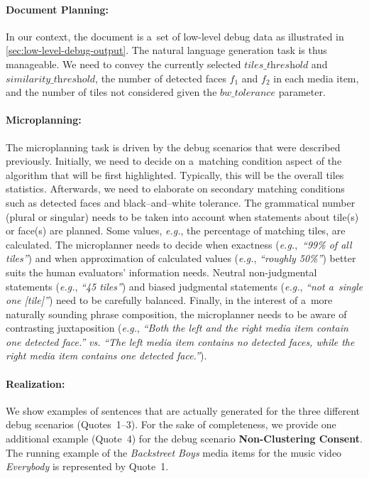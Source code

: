 \paragraph{Document Planning:}

In our context, the document is a~set of low-level debug data
as illustrated in \autoref{sec:low-level-debug-output}.
The natural language generation task is thus manageable.
We need to convey the currently selected $\textit{tiles\_threshold}$
and $\textit{similarity\_threshold}$, the number of detected faces
$f_1$ and $f_2$ in each media item, and the number of tiles
not considered given the $\textit{bw\_tolerance}$ parameter.

\paragraph{Microplanning:}

The microplanning task is driven by the debug scenarios
that were described previously.
Initially, we need to decide on a~matching condition aspect
of the algorithm that will be first highlighted.
Typically, this will be the overall tiles statistics.
Afterwards, we need to elaborate on secondary matching conditions
such as detected faces and black--and--white tolerance.
The grammatical number (plural or singular)
needs to be taken into account when statements about tile(s) or face(s)
are planned. Some values, \emph{e.g.},
the percentage of matching tiles, are calculated.
The microplanner needs to decide when exactness
(\emph{e.g.},~\textit{``99\% of all tiles''})
and when approximation of calculated values
(\emph{e.g.}, \textit{``roughly 50\%''}) better suits
the human evaluators' information needs. Neutral non-judgmental statements
(\emph{e.g.}, \textit{``45 tiles''}) and biased judgmental statements
(\emph{e.g.}, \textit{``not a~single one [tile]''})
need to be carefully balanced. Finally, in the interest of
a~more naturally sounding phrase composition,
the microplanner needs to be aware of contrasting juxtaposition
(\emph{e.g.}, \textit{``Both the left and the right media item
contain one detected face.''} \emph{vs.}
\textit{``The left media item contains no detected faces,
while the right media item contains one detected face.''}).

\paragraph{Realization:}

We show examples of sentences that are actually generated
for the three different debug scenarios (Quotes~1--3).
For the sake of completeness, we provide one additional example
(Quote~4) for the debug scenario \textbf{Non-Clustering Consent}.
The running example of the \emph{Backstreet Boys} media items
for the music video \emph{Everybody} is represented by Quote~1.

